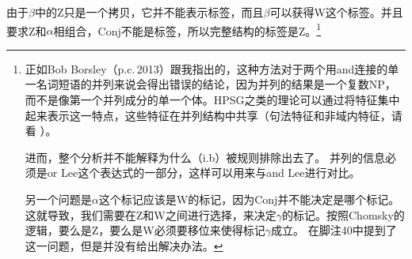 由于$\beta$中的Z只是一个拷贝，它并不能表示标签，而且$\beta$可以获得W这个标签。并且要求Z和$\alpha$相组合，Conj不能是标签，所以完整结构的标签是Z。\footnote{%
正如Bob Borsley（p.c.\,2013）跟我指出的，这种方法对于两个用and连接的单一名词短语的并列来说会得出错误的结论，因为并列的结果是一个复数NP，而不是像第一个并列成分的单一个体。HPSG之类的理论可以通过将特征集中起来表示这一特点，这些特征在并列结构中共享（句法特征和非域内特征，请看 ）。

进而，整个分析并不能解释为什么（i.b）被规则排除出去了。
\eal
\zl
并列的信息必须是or Lee这个表达式的一部分，这样可以用来与and Lee进行对比。

另一个问题是$\alpha$这个标记应该是W的标记，因为Conj并不能决定是哪个标记。这就导致，我们需要在Z和W之间进行选择，来决定$\gamma$的标记。按照Chomsky的逻辑，要么是Z，要么是W必须要移位来使得标记$\gamma$成立。 \citet{Chomsky2013a}在脚注40中提到了这一问题，但是并没有给出解决办法。
}

%

